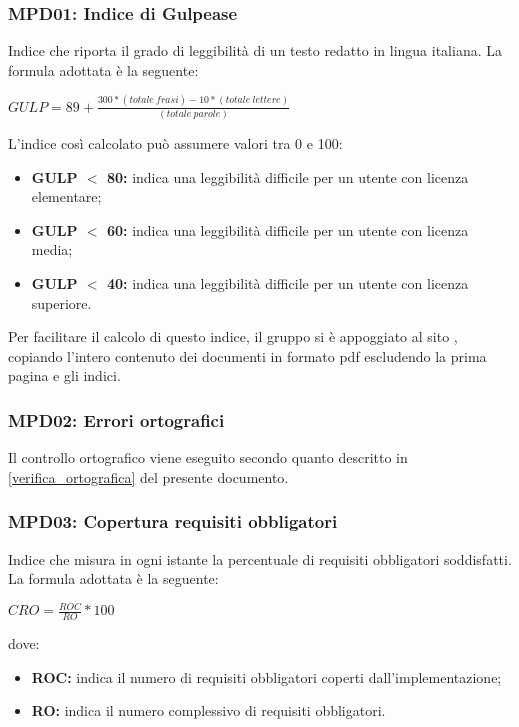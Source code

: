 \subsubsection{MPD01: Indice di Gulpease}
Indice che riporta il grado di leggibilità di un testo redatto in lingua italiana.
La formula adottata è la seguente:
\begin{center}
    $GULP = 89 + \displaystyle \frac{300*(totale\ frasi)-10*(totale\ lettere)}{(totale\ parole)}$
\end{center}
L’indice così calcolato può assumere valori tra 0 e 100:
\begin{itemize}
    \item \textbf{GULP $<$ 80:} indica una leggibilità difficile per un utente con licenza elementare;
    \item \textbf{GULP $<$ 60:} indica una leggibilità difficile per un utente con licenza media;
    \item \textbf{GULP $<$ 40:} indica una leggibilità difficile per un utente con licenza superiore.
\end{itemize}

Per facilitare il calcolo di questo indice, il gruppo si è appoggiato al sito \href{https://farfalla-project.org/readability_static/}, copiando
l'intero contenuto dei documenti in formato pdf escludendo la prima pagina e gli indici.

\subsubsection{MPD02: Errori ortografici}
Il controllo ortografico viene eseguito secondo quanto descritto in \ref{verifica_ortografica} del presente documento.

\subsubsection{MPD03: Copertura requisiti obbligatori}
Indice che misura in ogni istante la percentuale di requisiti obbligatori soddisfatti.
La formula adottata è la seguente:
\begin{center}
    $CRO = \displaystyle \frac{ROC}{RO}*100$
\end{center}
dove:
\begin{itemize}
    \item \textbf{ROC:} indica il numero di requisiti obbligatori coperti dall'implementazione;
    \item \textbf{RO:} indica il numero complessivo di requisiti obbligatori.
\end{itemize}


